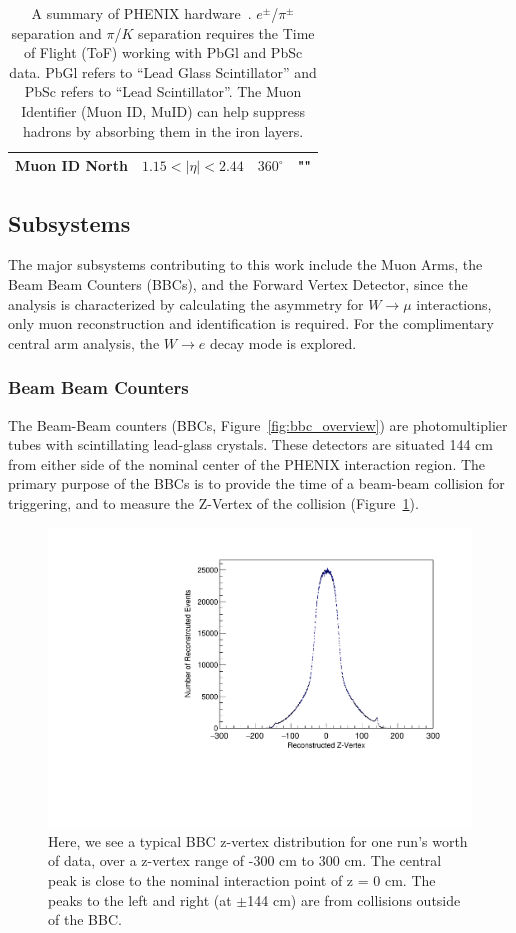 \begin{table}
\begin{tabular}{l c c p{5cm}}
    Muon ID North & $1.15 < \vert\eta\vert < 2.44$   & $360^{\circ}$ & "" \\
    \bottomrule 
  \end{tabular}
  \caption{
    A summary of PHENIX hardware~\cite{Adcox2003}. $e^\pm$/$\pi^\pm$ separation
    and $\pi$/$K$ separation requires the Time of Flight (ToF) working with
    PbGl and PbSc data. PbGl refers to ``Lead Glass Scintillator'' and PbSc
    refers to ``Lead Scintillator''. The Muon Identifier (Muon ID, MuID) can
    help suppress hadrons by absorbing them in the iron layers. 
  }
  \label{tab:phenix_detector_summary}
\end{table}

\clearpage

\subsection{Subsystems}

The major subsystems contributing to this work include the Muon Arms, the Beam
Beam Counters (BBCs), and the Forward Vertex Detector, since the analysis is
characterized by calculating the asymmetry for $W\rightarrow\mu$ interactions,
only muon reconstruction and identification is required. For the complimentary
central arm analysis, the $W\rightarrow e$ decay mode is explored.

\subsubsection{Beam Beam Counters}

The Beam-Beam counters (BBCs, Figure~\ref{fig:bbc_overview}) are
photomultiplier tubes with scintillating lead-glass crystals. These detectors
are situated 144 cm from either side of the nominal center of the PHENIX
interaction region. The primary purpose of the BBCs is to provide the time of a
beam-beam collision for triggering, and to measure the Z-Vertex of the
collision (Figure~\ref{fig:bbc_zvertex_example}).

\begin{figure}[ht]
  \centering
  \includegraphics[width=0.7\linewidth]{./figures/bbc_zvertex}
  \caption{
    Here, we see a typical BBC z-vertex distribution for one run's worth of
    data, over a z-vertex range of -300 cm to 300 cm. The central peak is close
    to the nominal interaction point of z = 0 cm. The peaks to the left and
    right (at $\pm$144 cm) are from collisions outside of the BBC.
  }
  \label{fig:bbc_zvertex_example}
\end{figure}

